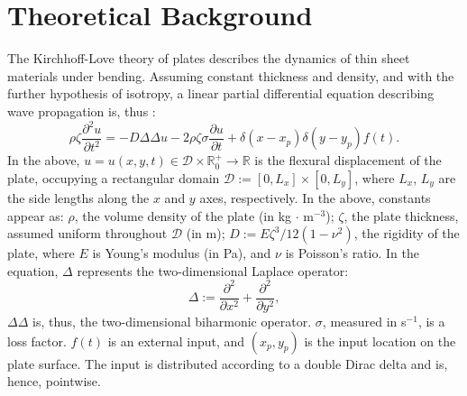 \section{Theoretical Background}\label{sec:BackGround}
\noindent
The Kirchhoff-Love theory of plates describes the dynamics of thin sheet materials under bending. Assuming constant thickness and density, and with the further hypothesis of isotropy, a linear partial differential equation describing wave propagation is, thus \cite{graff1991wave,bilbao_numerical_2009}:
\begin{equation}\label{eq:KLCnt}
\rho \zeta \frac{\partial^2 u}{\partial t^2} = - D \Delta\Delta u - 2\rho\zeta\sigma\frac{\partial u}{\partial t} + \delta(x-x_p)\delta(y-y_p)f(t).
\end{equation}
In the above, $u = u(x,y,t) \in {\mathcal D} \times \mathbb{R}^+_0 \rightarrow \mathbb{R}$ is the flexural displacement of the plate, occupying a rectangular domain ${\mathcal D} := [0,L_x] \times [0,L_y]$, where $L_x$, $L_y$ are the side lengths along the $x$ and $y$ axes, respectively. In the above, constants appear as: $\rho$, the volume density of the plate (in kg $\cdot$ m$^{-3}$); $\zeta$, the plate thickness, assumed uniform throughout ${\mathcal D}$ (in m); $D := E\zeta^3 / 12 (1-\nu^2)$, the rigidity of the plate, where $E$ is Young's modulus (in Pa), and $\nu$ is Poisson's ratio. In the equation, $\Delta$ represents the two-dimensional Laplace operator:
\begin{equation}
\Delta := \frac{\partial^2}{\partial x^2} + \frac{\partial^2}{\partial y^2},
\end{equation}
$\Delta\Delta$ is, thus, the two-dimensional biharmonic operator. $\sigma$, measured in s$^{-1}$, is a loss factor. $f(t)$ is an external input, and $(x_p,y_p)$ is the input location on the plate surface. The input is distributed according to a double Dirac delta and is, hence, pointwise.


